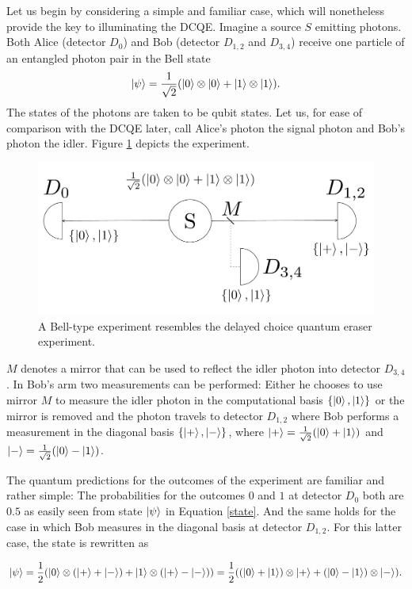 \documentclass[11pt]{article}
\numberwithin{equation}{section}
\begin{document}
Let us begin by considering a simple and familiar case, which will nonetheless provide the key to illuminating the DCQE. Imagine a source $S$ emitting photons. Both Alice (detector $D_0$) and Bob (detector $D_{1,2}$ and $D_{3,4}$) receive one particle of an entangled photon pair in the Bell state
\begin{equation}
\label{state}
\ket{\psi}=\frac{1}{\sqrt{2}}(\ket{0}\otimes\ket{0}+\ket{1}\otimes\ket{1}).
\end{equation} 
The states of the photons are taken to be qubit states. Let us, for ease of comparison with the DCQE later, call Alice's photon the signal photon and Bob's photon the idler. Figure \ref{fig:BellD} depicts the experiment.
\begin{figure}[H]
\centering
\includegraphics[width=0.7\linewidth]{./BellD.pdf}
\caption{A Bell-type experiment resembles the delayed choice quantum eraser experiment.}
\label{fig:BellD}
\end{figure}

$M$ denotes a mirror that can be used to reflect the idler photon into detector $D_{3,4}$. In Bob's arm two measurements can be performed: Either he chooses to use mirror $M$ to measure the idler photon in the computational basis $\{\ket{0},\ket{1}\}$ or the mirror is removed and the photon travels to detector $D_{1,2}$ where Bob performs a measurement in the diagonal basis  $\{\ket{+},\ket{-}\}$, where $\ket{+}=\frac{1}{\sqrt{2}}(\ket{0}+\ket{1})$ and $\ket{-}=\frac{1}{\sqrt{2}}(\ket{0}-\ket{1})$. 

The quantum predictions for the outcomes of the experiment are familiar and rather simple: The probabilities for the outcomes $0$ and $1$ at detector $D_0$ both are $0.5$ as easily seen from state $\ket{\psi}$ in Equation \ref{state}. And the same holds for the case in which Bob measures in the diagonal basis at detector $D_{1,2}$. For this latter case, the state is rewritten as   

\begin{equation}
\label{eraser state}
\ket{\psi}=\frac{1}{2}(\ket{0}\otimes(\ket{+}+\ket{-})+\ket{1}\otimes(\ket{+}-\ket{-})) =\frac{1}{2}((\ket{0}+\ket{1})\otimes\ket{+}+(\ket{0}-\ket{1})\otimes\ket{-}).
\end{equation}
\end{document}
